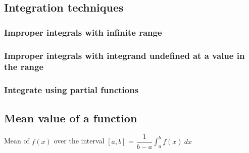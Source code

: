 \subsection{Integration techniques}
\subsubsection{Improper integrals with infinite range}
\subsubsection{Improper integrals with integrand undefined at a value in the range}
\subsubsection{Integrate using partial functions}
\subsection{Mean value of a function}
Mean of $f(x)$ over the interval $[a,b]$ = $\dfrac{1}{b-a}\int_{a}^{b} f(x) \: dx$